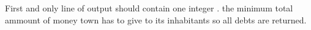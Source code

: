 First and only line of output should contain one integer . the minimum total ammount of money town  has to give to its inhabitants so all debts are returned.